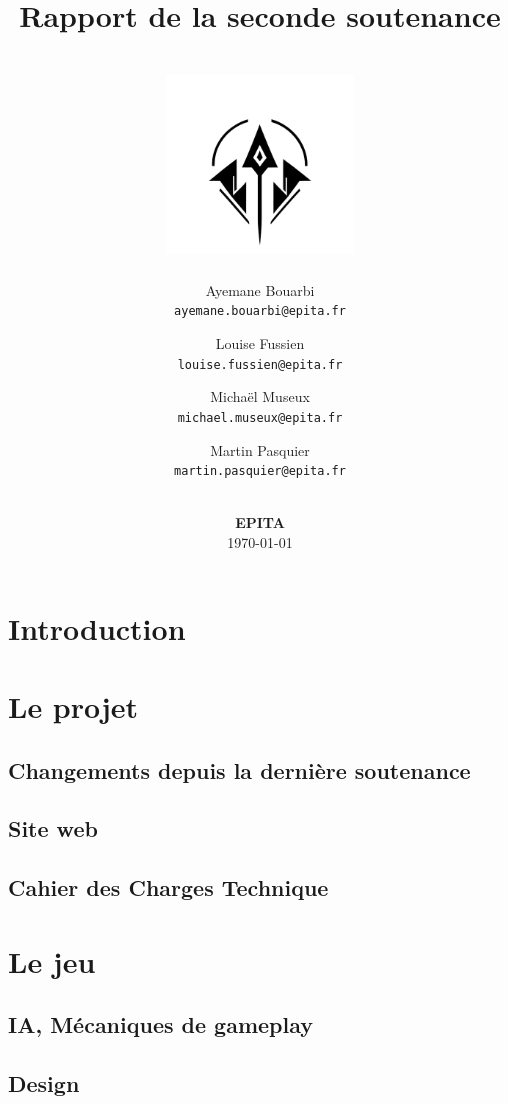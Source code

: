 \documentclass[12pt]{article}
\title{
    Rapport de la seconde soutenance \\
    \textbf{\gameName} \\
    \vspace{0.5cm}
    \includegraphics[width=5cm]{0.format/logo.png}
    \vspace{4.2cm}
}
\author{
    Ayemane Bouarbi \\
    \texttt{ayemane.bouarbi@epita.fr}
    \vspace{0.5cm}\and
    Louise Fussien \\
    \texttt{louise.fussien@epita.fr}
    \vspace{0.5cm}\and
    Michaël Museux \\
    \texttt{michael.museux@epita.fr}
    \vspace{0.5cm}\and
    Martin Pasquier \\
    \texttt{martin.pasquier@epita.fr}
}
\date{
    \vspace{1.5cm}
    \textbf{\companyName} \\
    \vspace{0.3cm}
    \textbf{EPITA} \\
    \vspace{1.5cm}
    \today
}
\begin{document}
\begin{titlepage}
    \maketitle
    \thispagestyle{empty} %
\end{titlepage}

\newpage
\thispagestyle{empty}
\mbox{}

\newpage
\tableofcontents

\newpage
\section{Introduction}
% 


\newpage
\section{Le projet}

\subsection{Changements depuis la dernière soutenance}
% 

\subsection{Site web}
% 

\subsection{Cahier des Charges Technique}
% 


\newpage
\section{Le jeu}

\subsection{IA, Mécaniques de gameplay}
% 

\subsection{Design}
% 
\end{document}
